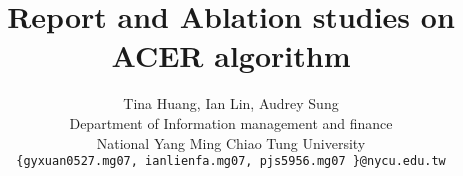 \documentclass{article}
\title{Report and Ablation studies on ACER algorithm}
\author{%
  Tina Huang, Ian Lin, Audrey Sung\\
  Department of Information management and finance\\
  National Yang Ming Chiao Tung University\\
  \texttt{\{gyxuan0527.mg07, ianlienfa.mg07, pjs5956.mg07 \}@nycu.edu.tw}
}
\begin{document}
\maketitle











{
  \small
  
  
}
\end{document}
